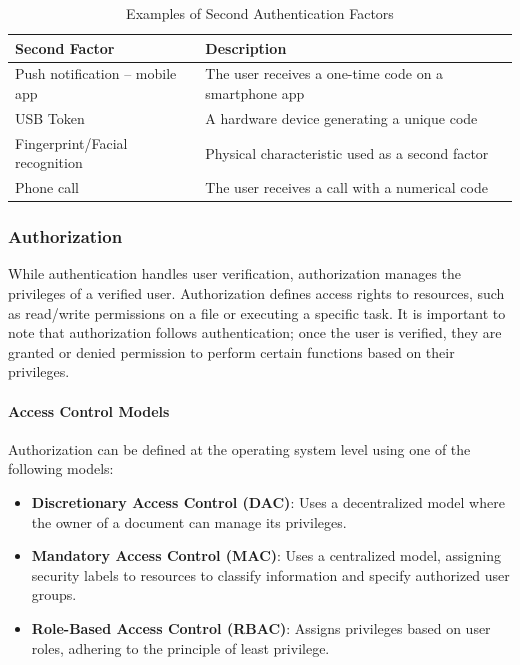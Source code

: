 \begin{table}[h]
    \centering
    \begin{tabular}{|l|l|}
    \hline
    \textbf{Second Factor} & \textbf{Description} \\ \hline
    Push notification – mobile app & The user receives a one-time code on a smartphone app \\ \hline
    USB Token & A hardware device generating a unique code \\ \hline
    Fingerprint/Facial recognition & Physical characteristic used as a second factor \\ \hline
    Phone call & The user receives a call with a numerical code \\ \hline
    \end{tabular}
    \caption{Examples of Second Authentication Factors}
    \label{tab:second_authentication_factors}
\end{table}


\subsubsection{Authorization}
While authentication handles user verification, authorization manages the privileges of a verified user. Authorization defines access rights to resources, such as read/write permissions on a file or executing a specific task. It is important to note that authorization follows authentication; once the user is verified, they are granted or denied permission to perform certain functions based on their privileges.

\paragraph{Access Control Models}
Authorization can be defined at the operating system level using one of the following models:

\begin{itemize}
    \item \textbf{Discretionary Access Control (DAC)}: Uses a decentralized model where the owner of a document can manage its privileges.
    \item \textbf{Mandatory Access Control (MAC)}: Uses a centralized model, assigning security labels to resources to classify information and specify authorized user groups.
    \item \textbf{Role-Based Access Control (RBAC)}: Assigns privileges based on user roles, adhering to the principle of least privilege.
\end{itemize}

